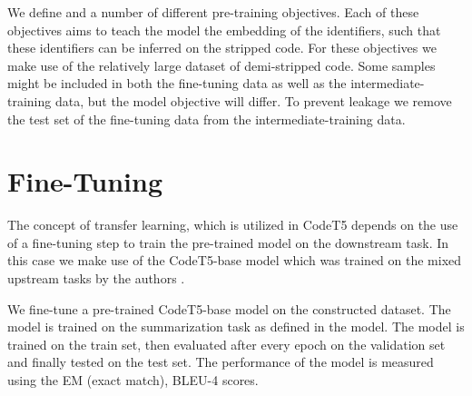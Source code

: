 We define and a number of different pre-training objectives. Each of these objectives aims to teach the model the embedding of the identifiers, such that these identifiers can be inferred on the stripped code. For these objectives we make use of the relatively large dataset of demi-stripped code. Some samples might be included in both the fine-tuning data as well as the intermediate-training data, but the model objective will differ. To prevent leakage we remove the test set of the fine-tuning data from the intermediate-training data. 

\section{Fine-Tuning}
The concept of transfer learning, which is utilized in CodeT5 depends on the use of a fine-tuning step to train the pre-trained model on the downstream task. In this case we make use of the CodeT5-base model which was trained on the mixed upstream tasks by the authors \cite{CodeT5}.

We fine-tune a pre-trained CodeT5-base model on the constructed dataset. The model is trained on the summarization task as defined in the model. The model is trained on the train set, then evaluated after every epoch on the validation set and finally tested on the test set. The performance of the model is measured using the EM (exact match), BLEU-4 scores. 